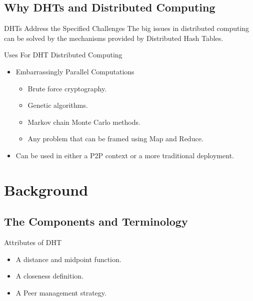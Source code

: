 \documentclass[11pt]{beamer}
\begin{document}
\subsection{Why DHTs and Distributed Computing}

\begin{frame}{DHTs Address the Specified Challenges}
The big issues in distributed computing can be solved by the mechanisms provided by Distributed Hash Tables.

\end{frame}

\begin{frame}{Uses For DHT Distributed Computing}
	\begin{itemize}
		\item Embarrassingly Parallel Computations
		\begin{itemize}
			\item Brute force cryptography.
			\item Genetic algorithms.
			\item Markov chain Monte Carlo methods.
			\item Any problem that can be framed using Map and Reduce.
		\end{itemize}
		\item Can be used in either a P2P context or a more traditional deployment.
	\end{itemize}
\end{frame}


\section{Background}

\subsection{The Components and Terminology}


\begin{frame}{Attributes of DHT}
	\begin{itemize}
		\item A distance and midpoint function.
		\item A closeness definition.
		\item A Peer management strategy.
	\end{itemize}
\end{frame}
\end{document}
